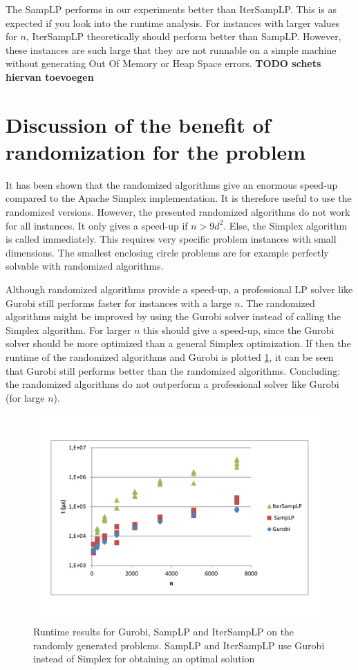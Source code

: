 \documentclass[nocopyrightspace]{acm_proc_article-sp}
\begin{document}
The SampLP performs in our experiments better than IterSampLP. This is as expected if you look into the runtime analysis. For instances with larger values for $n$, IterSampLP theoretically should perform better than SampLP. However, these instances are such large that they are not runnable on a simple machine without generating Out Of Memory or Heap Space errors. 
\textbf{TODO schets hiervan toevoegen}


\section{Discussion of the benefit of randomization for the problem}
It has been shown that the randomized algorithms give an enormous speed-up compared to the Apache Simplex implementation. It is therefore useful to use the randomized versions. However, the presented randomized algorithms do not work for all instances. It only gives a speed-up if $n>9d^2$. Else, the Simplex algorithm is called immediately. This requires very specific problem instances with small dimensions. The smallest enclosing circle problems are for example perfectly solvable with randomized algorithms.

Although randomized algorithms provide a speed-up, a professional LP solver like Gurobi still performs faster for instances with a large $n$. The randomized algorithms might be improved by using the Gurobi solver instead of calling the Simplex algorithm. For larger $n$ this should give a speed-up, since the Gurobi solver should be more optimized than a general Simplex optimization. If then the runtime of the randomized algorithms and Gurobi is plotted \ref{fig:gurobiruntime}, it can be seen that Gurobi still performs better than the randomized algorithms. Concluding: the randomized algorithms do not outperform a professional solver like Gurobi (for large $n$). 

\begin{figure}[h!]
\includegraphics[width=\columnwidth]{../Results/gurobi_runtime.pdf}
\caption{Runtime results for Gurobi, SampLP and IterSampLP on the randomly generated problems. SampLP and IterSampLP use Gurobi instead of Simplex for obtaining an optimal solution}
\label{fig:gurobiruntime}
\end{figure}
\end{document}
